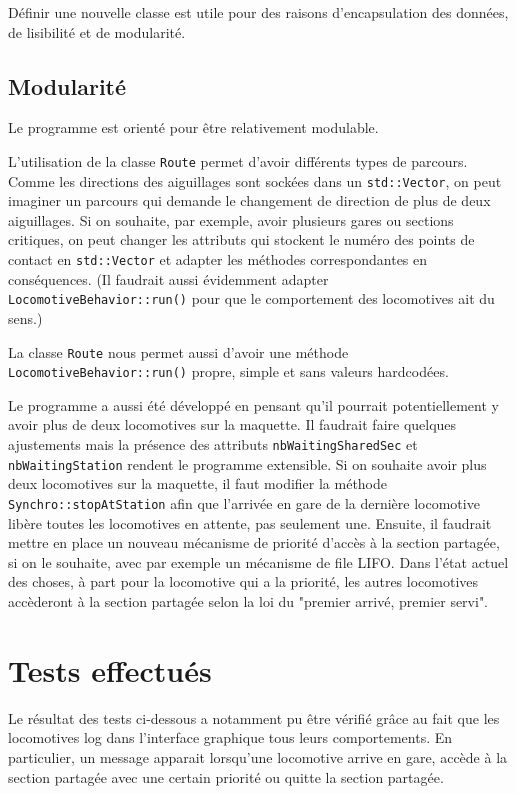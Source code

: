 \documentclass{article}
\begin{document}
Définir une nouvelle classe est utile pour des raisons d'encapsulation des données, de lisibilité et de modularité.

\subsection*{Modularité}
Le programme est orienté pour être relativement modulable.

L'utilisation de la classe \texttt{Route} permet d'avoir différents types de parcours. Comme les directions des aiguillages
sont sockées dans un \texttt{std::Vector}, on peut imaginer un parcours qui demande le changement de direction de plus de 
deux aiguillages. Si on souhaite, par exemple, avoir plusieurs gares ou sections critiques, on peut changer les attributs qui stockent
le numéro des points de contact en \texttt{std::Vector} et adapter les méthodes correspondantes en conséquences. (Il faudrait aussi 
évidemment adapter \texttt{LocomotiveBehavior::run()} pour que le comportement des locomotives ait du sens.)

La classe \texttt{Route} nous permet aussi d'avoir une méthode \texttt{LocomotiveBehavior::run()} propre, simple et sans valeurs 
hardcodées.

Le programme a aussi été développé en pensant qu'il pourrait potentiellement y avoir plus de deux locomotives sur la maquette. Il faudrait
faire quelques ajustements mais la présence des attributs \texttt{nbWaitingSharedSec} et \texttt{nbWaitingStation} rendent le programme
extensible. Si on souhaite avoir plus deux locomotives sur la  maquette, il faut modifier la méthode \texttt{Synchro::stopAtStation} afin
que l'arrivée en gare de la dernière locomotive libère toutes les locomotives en attente, pas seulement une. Ensuite, il faudrait 
mettre en place un nouveau mécanisme de priorité d'accès à la section partagée, si on le souhaite, avec par exemple un mécanisme de file
LIFO. Dans l'état actuel des choses, à part pour la locomotive qui a la priorité, les autres locomotives accèderont à la section partagée 
selon la loi du "premier arrivé, premier servi". 

\section*{Tests effectués}

Le résultat des tests ci-dessous a notamment pu être vérifié grâce au fait que les locomotives log dans l'interface graphique tous leurs
comportements. En particulier, un message apparait lorsqu'une locomotive arrive en gare, accède à la section partagée avec une certain priorité
ou quitte la section partagée.
\end{document}
